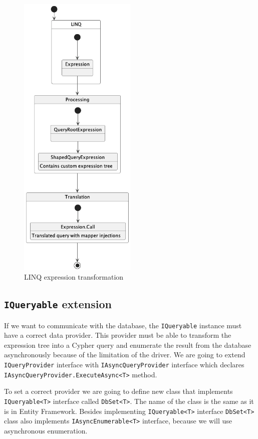 \begin{figure}[H]
	\centering
	\includegraphics[width=0.5\textwidth]{content/Expression transformation.png}
	\caption{LINQ expression transformation}
	\label{fig:querystate}
\end{figure}

\subsection{\texttt{IQueryable} extension}

If we want to communicate with the database, the \texttt{IQueryable} instance must have a correct data provider.
This provider must be able to transform the expression tree into a Cypher query and enumerate the result from the database asynchronously because of the limitation of the driver.
We are going to extend \texttt{IQueryProvider} interface with \texttt{IAsyncQueryProvider} interface which declares \texttt{IAsyncQueryProvider.ExecuteAsync<T>} method.

To set a correct provider we are going to define new class that implements \texttt{IQueryable<T>} interface called \texttt{DbSet<T>}.
The name of the class is the same as it is in Entity Framework.
Besides implementing \texttt{IQueryable<T>} interface \texttt{DbSet<T>} class also implements \texttt{IAsyncEnumerable<T>} interface, because we will use asynchronous enumeration.

